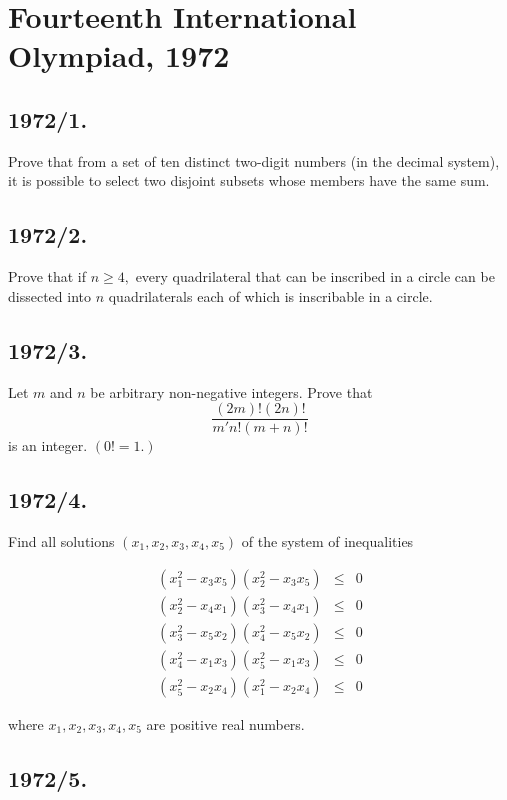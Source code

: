 \documentclass[12pt,thmsa]{article}
\begin{document}
\section{Fourteenth International Olympiad, 1972}

\subsection{1972/1.}

Prove that from a set of ten distinct two-digit numbers (in the decimal
system), it is possible to select two disjoint subsets whose members have
the same sum.

\subsection{1972/2.}

Prove that if $n\geq 4,$ every quadrilateral that can be inscribed in a
circle can be dissected into $n$ quadrilaterals each of which is inscribable
in a circle.

\subsection{1972/3.}

Let $m$ and $n$ be arbitrary non-negative integers. Prove that
\[
\frac{(2m)!(2n)!}{m\prime n!(m+n)!}
\]
is an integer. $(0!=1.)$

\subsection{1972/4.}

Find all solutions $(x_{1},x_{2},x_{3},x_{4},x_{5})$ of the system of
inequalities

\begin{eqnarray*}
(x_{1}^{2}-x_{3}x_{5})(x_{2}^{2}-x_{3}x_{5}) &\leq &0 \\
(x_{2}^{2}-x_{4}x_{1})(x_{3}^{2}-x_{4}x_{1}) &\leq &0 \\
(x_{3}^{2}-x_{5}x_{2})(x_{4}^{2}-x_{5}x_{2}) &\leq &0 \\
(x_{4}^{2}-x_{1}x_{3})(x_{5}^{2}-x_{1}x_{3}) &\leq &0 \\
(x_{5}^{2}-x_{2}x_{4})(x_{1}^{2}-x_{2}x_{4}) &\leq &0
\end{eqnarray*}

where $x_{1},x_{2},x_{3},x_{4},x_{5}$ are positive real numbers.

\subsection{1972/5.}
\end{document}
